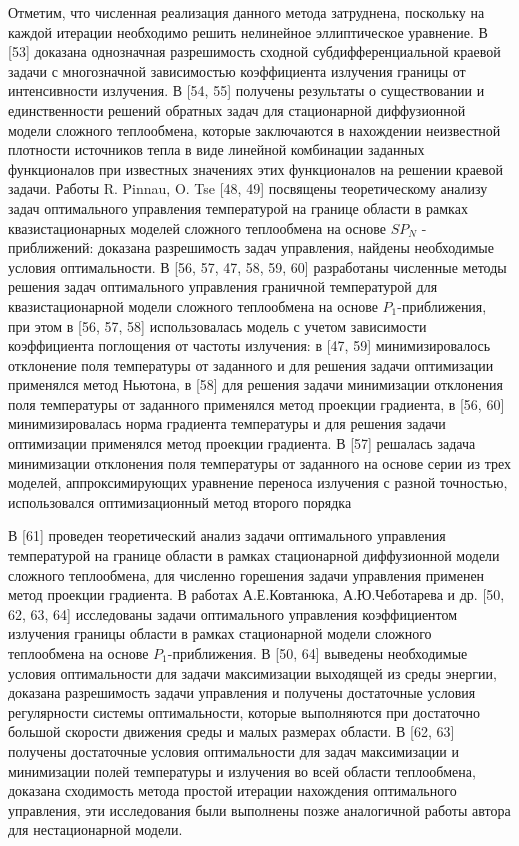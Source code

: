 Отметим, что численная реализация данного метода затруднена, поскольку на каждой итерации необходимо решить
нелинейное эллиптическое уравнение.
В [53] доказана однозначная разрешимость сходной субдифференциальной краевой задачи с многозначной
зависимостью коэффициента излучения границы от интенсивности излучения.
В [54, 55] получены результаты о существовании и единственности решений обратных задач для стационарной диффузионной
модели сложного теплообмена, которые заключаются в нахождении неизвестной плотности источников тепла в виде линейной
комбинации заданных функционалов при известных значениях этих функционалов на решении краевой задачи.
Работы R. Pinnau, O. Tse [48, 49] посвящены теоретическому анализу задач оптимального управления температурой на границе
области в рамках квазистационарных моделей сложного теплообмена на основе
$SP_N$ - приближений: доказана разрешимость задач управления, найдены необходимые условия оптимальности.
В [56, 57, 47, 58, 59, 60] разработаны численные методы решения задач оптимального управления граничной температурой
для квазистационарной модели сложного теплообмена на основе $P_1$-приближения,
при этом в [56, 57, 58] использовалась модель с учетом зависимости коэффициента поглощения от частоты излучения:
в [47, 59] минимизировалось отклонение поля температуры от заданного и для решения задачи оптимизации применялся метод Ньютона,
в [58] для решения задачи минимизации отклонения поля температуры от заданного применялся метод проекции градиента, в [56,
60] минимизировалась норма градиента температуры и для решения задачи
оптимизации применялся метод проекции градиента.
В [57] решалась задача минимизации отклонения поля температуры от заданного на основе серии из
трех моделей, аппроксимирующих уравнение переноса излучения с разной точностью,
использовался оптимизационный метод второго порядка


В [61] проведен теоретический анализ задачи оптимального управления
температурой на границе области в рамках стационарной диффузионной модели
сложного теплообмена, для численно горешения задачи управления применен
метод проекции градиента.
В работах А.Е.Ковтанюка, А.Ю.Чеботарева и др. [50, 62, 63, 64] исследованы задачи оптимального управления коэффициентом
излучения границы области в рамках стационарной модели сложного теплообмена на основе $P_1$-приближения.
В [50, 64] выведены необходимые условия оптимальности для задачи максимизации выходящей из среды энергии,
доказана разрешимость задачи управления и получены достаточные условия регулярности системы оптимальности,
которые выполняются при достаточно большой скорости движения среды и малых размерах области.
В [62, 63] получены достаточные условия оптимальности для задач максимизации и минимизации полей температуры и излучения
во всей области теплообмена, доказана сходимость метода простой итерации нахождения оптимального управления,
эти исследования были выполнены позже аналогичной работы автора для нестационарной модели.


